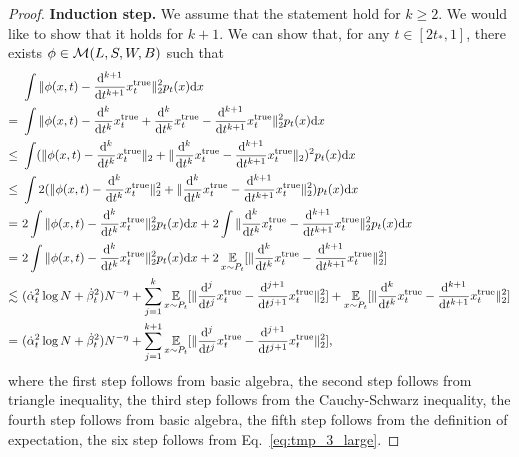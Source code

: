 \begin{proof}
    \textbf{Induction step.} We assume that the statement hold for $k \geq 2$. We would like to show that it holds for $k+1$. We can show that, for any $t \in [2t_*, 1]$, there exists $\phi \in {\cal M}(L,S,W, B)$ such that
    \begin{align}
    &~ \int \|\phi(x, t) - \frac{\mathrm{d}^{k+1}}{\mathrm{d} t^{k+1}}{x}_t^\mathrm{true}\|^2_2 p_t(x) \mathrm{d} x \notag
    \\ = &~
    \int \|\phi(x, t) - \frac{\mathrm{d}^{k}}{\mathrm{d} t^{k}}{x}_t^\mathrm{true} + \frac{\mathrm{d}^{k}}{\mathrm{d} t^{k}}{x}_t^\mathrm{true} - \frac{\mathrm{d}^{k+1}}{\mathrm{d} t^{k+1}}{x}_t^\mathrm{true}\|^2_2 p_t(x) \mathrm{d} x \notag \\
    \leq &~ \int (\|\phi(x, t) - \frac{\mathrm{d}^{k}}{\mathrm{d} t^{k}}{x}_t^\mathrm{true}\|_2 + \| \frac{\mathrm{d}^{k}}{\mathrm{d} t^{k}}{x}_t^\mathrm{true} - \frac{\mathrm{d}^{k+1}}{\mathrm{d} t^{k+1}}{x}_t^\mathrm{true}\|_2 )^2 p_t(x) \mathrm{d} x \notag \\
    \leq &~ \int 2(\|\phi(x, t) - \frac{\mathrm{d}^{k}}{\mathrm{d} t^{k}}{x}_t^\mathrm{true}\|_2^2 + \| \frac{\mathrm{d}^{k}}{\mathrm{d} t^{k}}{x}_t^\mathrm{true} - \frac{\mathrm{d}^{k+1}}{\mathrm{d} t^{k+1}}{x}_t^\mathrm{true}\|_2^2) p_t(x) \mathrm{d} x \notag \\
    = &~ 2\int \|\phi(x, t) - \frac{\mathrm{d}^{k}}{\mathrm{d} t^{k}}{x}_t^\mathrm{true}\|_2^2p_t(x) \mathrm{d} x + 2 \int \| \frac{\mathrm{d}^{k}}{\mathrm{d} t^{k}}{x}_t^\mathrm{true} - \frac{\mathrm{d}^{k+1}}{\mathrm{d} t^{k+1}}{x}_t^\mathrm{true}\|_2^2 p_t(x) \mathrm{d} x \notag \\
    = &~ 2\int \|\phi(x, t) - \frac{\mathrm{d}^{k}}{\mathrm{d} t^{k}}{x}_t^\mathrm{true}\|_2^2p_t(x) \mathrm{d} x + 2 \operatorname*{{\mathbb{E}}}_{x \sim P_t} [ \| \frac{\mathrm{d}^{k}}{\mathrm{d} t^{k}}{x}_t^\mathrm{true} - \frac{\mathrm{d}^{k+1}}{\mathrm{d} t^{k+1}}{x}_t^\mathrm{true}\|_2^2]\notag \\
    \lesssim &~(\dot{\alpha}_t^{2} \log N  +   \dot{\beta}_t^{2} ) N^{-\eta} +
    \sum_{j=1}^{k}\operatorname*{{\mathbb{E}}}_{x \sim P_t}[\|\frac{\mathrm{d}^{j}}{\mathrm{d} t^{j}}x_t^\mathrm{true} - \frac{\mathrm{d}^{j+1}}{\mathrm{d} t^{j+1}}x_t^\mathrm{true}\|_2^2] + \operatorname*{{\mathbb{E}}}_{x \sim P_t} [ \| \frac{\mathrm{d}^{k}}{\mathrm{d} t^{k}}{x}_t^\mathrm{true} - \frac{\mathrm{d}^{k+1}}{\mathrm{d} t^{k+1}}{x}_t^\mathrm{true}\|_2^2]\notag \\
    = &~ (\dot{\alpha}_t^{2} \log N  +   \dot{\beta}_t^{2} ) N^{-\eta}+
    \sum_{j=1}^{k+1}\operatorname*{{\mathbb{E}}}_{x \sim P_t}[\|\frac{\mathrm{d}^{j}}{\mathrm{d} t^{j}}x_t^\mathrm{true} - \frac{\mathrm{d}^{j+1}}{\mathrm{d} t^{j+1}}x_t^\mathrm{true}\|_2^2], \label{eq:tmp_4_large}
    \end{align}
    where the first step follows from basic algebra, the second step follows from triangle inequality, the third step follows from the Cauchy-Schwarz inequality, the fourth step follows from basic algebra, the fifth step follows from the definition of expectation, the six step follows from Eq.~\eqref{eq:tmp_3_large}.
    

\end{proof}

